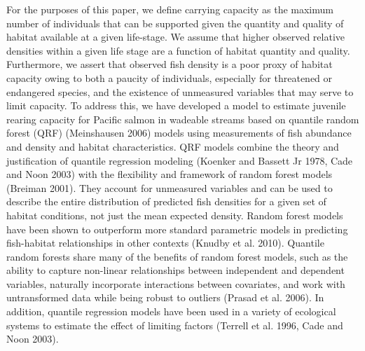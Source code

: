 \documentclass[
  12pt,
]{article}
\begin{document}
For the purposes of this paper, we define carrying capacity as the maximum number of individuals that can be supported given the quantity and quality of habitat available at a given life-stage. We assume that higher observed relative densities within a given life stage are a function of habitat quantity and quality. Furthermore, we assert that observed fish density is a poor proxy of habitat capacity owing to both a paucity of individuals, especially for threatened or endangered species, and the existence of unmeasured variables that may serve to limit capacity. To address this, we have developed a model to estimate juvenile rearing capacity for Pacific salmon in wadeable streams based on quantile random forest (QRF) (Meinshausen 2006) models using measurements of fish abundance and density and habitat characteristics. QRF models combine the theory and justification of quantile regression modeling (Koenker and Bassett Jr 1978, Cade and Noon 2003) with the flexibility and framework of random forest models (Breiman 2001). They account for unmeasured variables and can be used to describe the entire distribution of predicted fish densities for a given set of habitat conditions, not just the mean expected density. Random forest models have been shown to outperform more standard parametric models in predicting fish-habitat relationships in other contexts (Knudby et al. 2010). Quantile random forests share many of the benefits of random forest models, such as the ability to capture non-linear relationships between independent and dependent variables, naturally incorporate interactions between covariates, and work with untransformed data while being robust to outliers (Prasad et al. 2006). In addition, quantile regression models have been used in a variety of ecological systems to estimate the effect of limiting factors (Terrell et al. 1996, Cade and Noon 2003).
\end{document}
